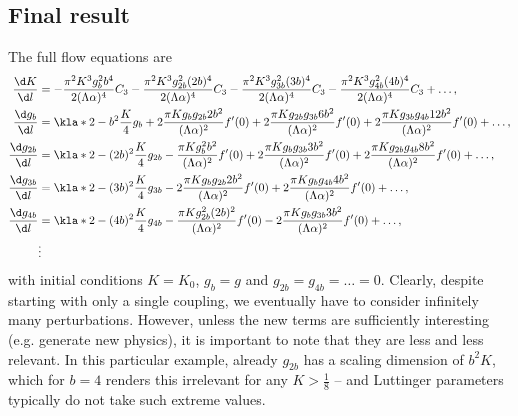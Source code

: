 \documentclass[english, parskip=full]{scrartcl}
\begin{document}
\subsection{Final result}
The full flow equations are
\begin{align}
\frac{\d K}{\d l} &= -\frac{\pi^2 K^3g_b^2b^4}{2(\Lambda\alpha)^4} C_3 -\frac{\pi^2 K^3g_{2b}^2(2b)^4}{2(\Lambda\alpha)^4} C_3 -\frac{\pi^2 K^3g_{3b}^2(3b)^4}{2(\Lambda\alpha)^4} C_3 -\frac{\pi^2 K^3g_{4b}^2(4b)^4}{2(\Lambda\alpha)^4} C_3 + \dots,\\
\frac{\d g_b}{\d l} &= \kla*{2 - b^2 \frac{K}{4}} g_b + 2\frac{\pi K g_{b} g_{2b} 2b^2}{(\Lambda\alpha)^2} f'(0) + 2\frac{\pi K g_{2b} g_{3b} 6b^2}{(\Lambda\alpha)^2} f'(0) + 2\frac{\pi K g_{3b} g_{4b} 12b^2}{(\Lambda\alpha)^2} f'(0) + \dots,\\
\frac{\d g_{2b}}{\d l} &= \kla*{2 - (2b)^2 \frac{K}{4}} g_{2b} -\frac{\pi K g_b^2b^2}{(\Lambda\alpha)^2} f'(0) + 2\frac{\pi K g_b g_{3b} 3b^2}{(\Lambda\alpha)^2} f'(0) + 2\frac{\pi K g_{2b} g_{4b} 8b^2}{(\Lambda\alpha)^2} f'(0) + \dots,\\
\frac{\d g_{3b}}{\d l} &= \kla*{2 - (3b)^2 \frac{K}{4}} g_{3b} - 2\frac{\pi K g_b g_{2b} 2b^2}{(\Lambda\alpha)^2} f'(0) + 2\frac{\pi K g_b g_{4b} 4b^2}{(\Lambda\alpha)^2} f'(0) + \dots,\\
\frac{\d g_{4b}}{\d l} &= \kla*{2 - (4b)^2 \frac{K}{4}} g_{4b} -\frac{\pi K g_{2b}^2(2b)^2}{(\Lambda\alpha)^2} f'(0) - 2\frac{\pi Kg_b g_{3b} 3b^2}{(\Lambda\alpha)^2} f'(0) + \dots,\\
&\vdots
\end{align}
with initial conditions $K=K_0$, $g_b=g$ and $g_{2b}= g_{4b} = \dots =0$.
Clearly, despite starting with only a single coupling, we eventually have to consider infinitely many perturbations.
However, unless the new terms are sufficiently interesting (e.g. generate new physics), it is important to note that they are less and less relevant.
In this particular example, already $g_{2b}$ has a scaling dimension of $b^2K$, which for $b=4$ renders this irrelevant for any $K>\frac{1}{8}$ -- and Luttinger parameters typically do not take such extreme values.
\end{document}
